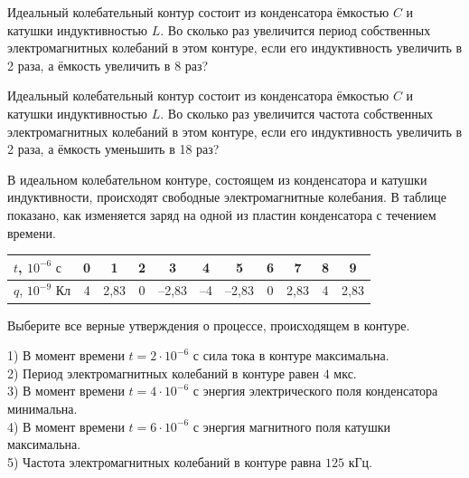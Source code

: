 \begin{taskbasic}[code={\label{task:elem_osc_v11_n13}}]
Идеальный колебательный контур состоит из конденсатора ёмкостью $C$ и катушки индуктивностью $L$. Во сколько раз увеличится период собственных электромагнитных колебаний в этом контуре, если его индуктивность увеличить в 2 раза, а ёмкость увеличить в 8 раз?

\end{taskbasic}

\begin{taskbasic}[code={\label{task:elem_osc_v12_n13}}]
Идеальный колебательный контур состоит из конденсатора ёмкостью $C$ и катушки индуктивностью $L$. Во сколько раз увеличится частота собственных электромагнитных колебаний в этом контуре, если его индуктивность увеличить в 2 раза, а ёмкость уменьшить в 18 раз?

\end{taskbasic}

\begin{taskbasic}[code={\label{task:elem_osc_v17_n14}}]
В идеальном колебательном контуре, состоящем из конденсатора и катушки индуктивности, происходят свободные электромагнитные колебания. В таблице показано, как изменяется заряд на одной из пластин конденсатора с течением времени.

\nopagebreak\smallskip
\begin{center}
\small
\begin{tabular}{|l|c|c|c|c|c|c|c|c|c|c|}
\hline
$t$, $10^{-6}\text{ с}$ & 0 & 1 & 2 & 3 & 4 & 5 & 6 & 7 & 8 & 9 \\ \hline
$q$, $10^{-9}\text{ Кл}$ & 4 & 2,83 & 0 & --2,83 & --4 & --2,83 & 0 & 2,83 & 4 & 2,83 \\ \hline
\end{tabular}
\end{center}
\smallskip

Выберите все верные утверждения о процессе, происходящем в контуре.

1) В момент времени $t = 2\cdot 10^{-6}\text{ с}$ сила тока в контуре максимальна.\\
2) Период электромагнитных колебаний в контуре равен $4\text{ мкс}$.\\
3) В момент времени $t = 4\cdot 10^{-6}\text{ с}$ энергия электрического поля конденсатора минимальна.\\
4) В момент времени $t = 6\cdot 10^{-6}\text{ с}$ энергия магнитного поля катушки максимальна.\\
5) Частота электромагнитных колебаний в контуре равна $125\text{ кГц}$.

\end{taskbasic}

